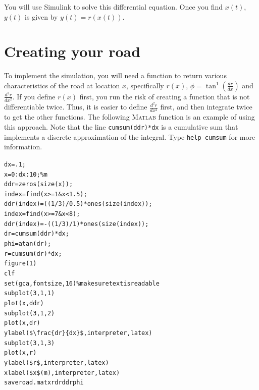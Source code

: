 You will use Simulink to solve this differential equation. Once you find $x(t)$, $y(t)$ is given by $y(t)=r(x(t))$.

\section{Creating your road}

To implement the simulation, you will need a function to return various characteristics of the road at location $x$, specifically $r(x)$, $\phi = \tan^{1}\left(\frac{dr}{dx}\right)$ and $\frac{d^2r}{dx^2}$. If you define $r(x)$ first, you run the risk of creating a function that is not differentiable twice. Thus, it is easier to define $\frac{d^2r}{dx^2}$ first, and then integrate twice to get the other functions. The following \textsc{Matlab} function is an example of using this approach. Note that the line \texttt{cumsum(ddr)*dx} is a cumulative sum that implements a discrete approximation of the integral. Type \texttt{help cumsum} for more information.

\begin{alltt}
%
%
dx=.1;
x = 0:dx:10; \% m
%
%
ddr = zeros(size(x));
%
%
index = find(x>=1 & x<1.5);
ddr(index) = ((1/3)/0.5)*ones(size(index));
%
%
index = find(x>=7 & x<8);
ddr(index) = -((1/3)/1)*ones(size(index));
%
%
dr = cumsum(ddr)*dx;
phi = atan(dr);
r = cumsum(dr)*dx;
%
%
figure(1)
clf
set(gca,\T\hspace{0pt}fontsize\T,16) \% make sure text is readable
subplot(3,1,1)
plot(x,ddr)
subplot(3,1,2)
plot(x,dr)
ylabel(\T\$\textbackslash\hspace{0pt}frac\{d r\}\{dx\}\$\T,\T\hspace{0pt}interpreter\T,\T\hspace{0pt}latex\T)
subplot(3,1,3)
plot(x,r)
ylabel(\T\$r\$\T,\T\hspace{0pt}interpreter\T,\T\hspace{0pt}latex\T)
xlabel(\T\$x\$ (m)\T,\T\hspace{0pt}interpreter\T,\T\hspace{0pt}latex\T)
%
%
save road.mat x r dr ddr phi


\end{alltt}


